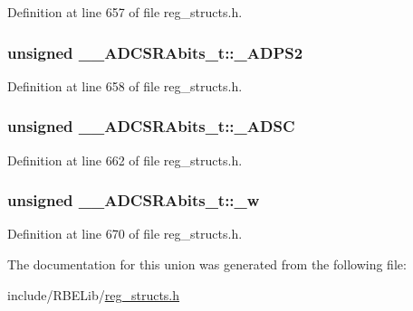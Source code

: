 Definition at line 657 of file reg\+\_\+structs.\+h.

\hypertarget{union_____a_d_c_s_r_abits__t_a231dd7847c93fde90b90001b7b848f59}{
\subsubsection[{\+\_\+\+A\+D\+P\+S2}]{\setlength{\rightskip}{0pt plus 5cm}unsigned \+\_\+\+\_\+\+A\+D\+C\+S\+R\+Abits\+\_\+t\+::\+\_\+\+A\+D\+P\+S2}}\label{union_____a_d_c_s_r_abits__t_a231dd7847c93fde90b90001b7b848f59}


Definition at line 658 of file reg\+\_\+structs.\+h.

\hypertarget{union_____a_d_c_s_r_abits__t_a3f0b0412d6883e292fa656a8383cdf67}{
\subsubsection[{\+\_\+\+A\+D\+S\+C}]{\setlength{\rightskip}{0pt plus 5cm}unsigned \+\_\+\+\_\+\+A\+D\+C\+S\+R\+Abits\+\_\+t\+::\+\_\+\+A\+D\+S\+C}}\label{union_____a_d_c_s_r_abits__t_a3f0b0412d6883e292fa656a8383cdf67}


Definition at line 662 of file reg\+\_\+structs.\+h.

\hypertarget{union_____a_d_c_s_r_abits__t_a1faa31f14f0aec54979ff3a9ff145cc4}{
\subsubsection[{\+\_\+w}]{\setlength{\rightskip}{0pt plus 5cm}unsigned \+\_\+\+\_\+\+A\+D\+C\+S\+R\+Abits\+\_\+t\+::\+\_\+w}}\label{union_____a_d_c_s_r_abits__t_a1faa31f14f0aec54979ff3a9ff145cc4}


Definition at line 670 of file reg\+\_\+structs.\+h.



The documentation for this union was generated from the following file\+:\begin{DoxyCompactItemize}
\item 
include/\+R\+B\+E\+Lib/\hyperlink{reg__structs_8h}{reg\+\_\+structs.\+h}\end{DoxyCompactItemize}
